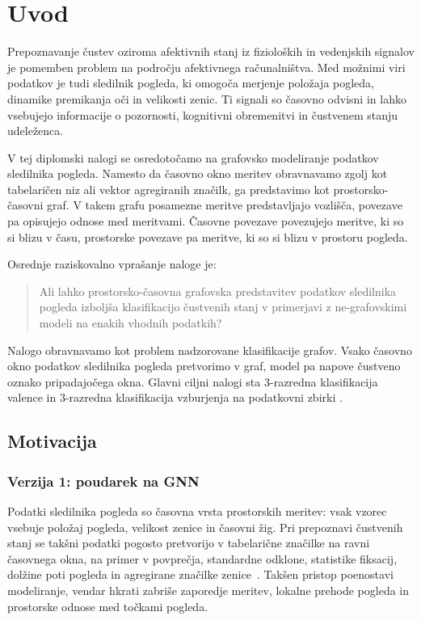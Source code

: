 \chapter{Uvod}
\label{sec:uvod}

Prepoznavanje čustev oziroma afektivnih stanj iz fizioloških in vedenjskih signalov je pomemben problem na področju afektivnega računalništva.
Med možnimi viri podatkov je tudi sledilnik pogleda, ki omogoča merjenje položaja pogleda, dinamike premikanja oči in velikosti zenic.
Ti signali so časovno odvisni in lahko vsebujejo informacije o pozornosti, kognitivni obremenitvi in čustvenem stanju udeleženca.

V tej diplomski nalogi se osredotočamo na grafovsko modeliranje podatkov sledilnika pogleda.
Namesto da časovno okno meritev obravnavamo zgolj kot tabelaričen niz ali vektor agregiranih značilk, ga predstavimo kot prostorsko-časovni graf.
V takem grafu posamezne meritve predstavljajo vozlišča, povezave pa opisujejo odnose med meritvami.
Časovne povezave povezujejo meritve, ki so si blizu v času, prostorske povezave pa meritve, ki so si blizu v prostoru pogleda.

Osrednje raziskovalno vprašanje naloge je:

\begin{quote}
Ali lahko prostorsko-časovna grafovska predstavitev podatkov sledilnika pogleda izboljša klasifikacijo čustvenih stanj v primerjavi z ne-grafovskimi modeli na enakih vhodnih podatkih?
\end{quote}

Nalogo obravnavamo kot problem nadzorovane klasifikacije grafov.
Vsako časovno okno podatkov sledilnika pogleda pretvorimo v graf, model pa napove čustveno oznako pripadajočega okna.
Glavni ciljni nalogi sta 3-razredna klasifikacija valence in 3-razredna klasifikacija vzburjenja na podatkovni zbirki \MAHNOB{}.

\section{Motivacija}
\label{subsec:motivacija}


\subsection{Verzija 1: poudarek na GNN}

Podatki sledilnika pogleda so časovna vrsta prostorskih meritev: vsak vzorec vsebuje položaj pogleda, velikost zenice in časovni žig.
Pri prepoznavi čustvenih stanj se takšni podatki pogosto pretvorijo v tabelarične značilke na ravni časovnega okna, na primer v povprečja, standardne odklone, statistike fiksacij, dolžine poti pogleda in agregirane značilke zenice~\cite{ref}.
Takšen pristop poenostavi modeliranje, vendar hkrati zabriše zaporedje meritev, lokalne prehode pogleda in prostorske odnose med točkami pogleda.

